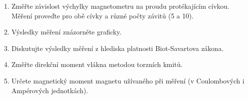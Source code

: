 \documentclass[0-protokol.tex]{subfiles}
\begin{document}
\begin{enumerate}
\item Změřte závislost výchylky magnetometru na proudu protékajícím cívkou. Měření proveďte pro obě cívky a různé počty závitů (5 a 10).
\item Výsledky měření znázorněte graficky.
\item Diskutujte výsledky měření z hlediska platnosti Biot-Savartova zákona.
\item Změřte direkční moment vlákna metodou torzních kmitů.
\item Určete magnetický moment magnetu užívaného při měření (v Coulombových i Ampérových jednotkách).
\end{enumerate}
\end{document}
